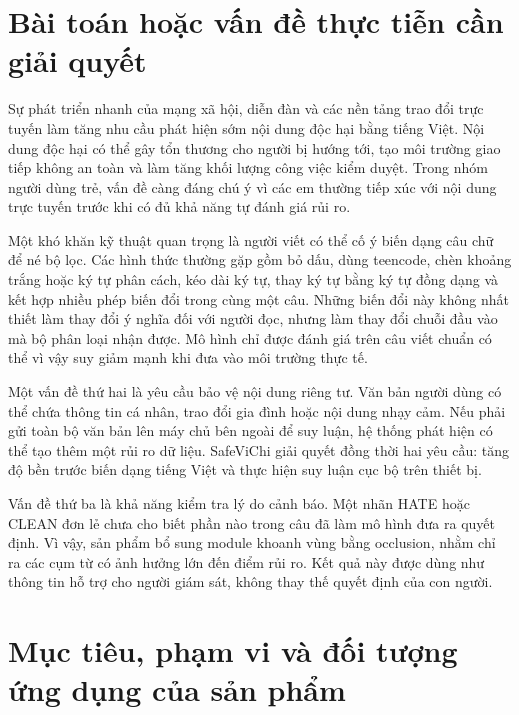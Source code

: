 \documentclass[12pt,a4paper]{article}
\begin{document}

\section{Bài toán hoặc vấn đề thực tiễn cần giải quyết}
Sự phát triển nhanh của mạng xã hội, diễn đàn và các nền tảng trao đổi trực tuyến làm tăng nhu cầu phát hiện sớm nội dung độc hại bằng tiếng Việt. Nội dung độc hại có thể gây tổn thương cho người bị hướng tới, tạo môi trường giao tiếp không an toàn và làm tăng khối lượng công việc kiểm duyệt. Trong nhóm người dùng trẻ, vấn đề càng đáng chú ý vì các em thường tiếp xúc với nội dung trực tuyến trước khi có đủ khả năng tự đánh giá rủi ro.

Một khó khăn kỹ thuật quan trọng là người viết có thể cố ý biến dạng câu chữ để né bộ lọc. Các hình thức thường gặp gồm bỏ dấu, dùng teencode, chèn khoảng trắng hoặc ký tự phân cách, kéo dài ký tự, thay ký tự bằng ký tự đồng dạng và kết hợp nhiều phép biến đổi trong cùng một câu. Những biến đổi này không nhất thiết làm thay đổi ý nghĩa đối với người đọc, nhưng làm thay đổi chuỗi đầu vào mà bộ phân loại nhận được. Mô hình chỉ được đánh giá trên câu viết chuẩn có thể vì vậy suy giảm mạnh khi đưa vào môi trường thực tế.

Một vấn đề thứ hai là yêu cầu bảo vệ nội dung riêng tư. Văn bản người dùng có thể chứa thông tin cá nhân, trao đổi gia đình hoặc nội dung nhạy cảm. Nếu phải gửi toàn bộ văn bản lên máy chủ bên ngoài để suy luận, hệ thống phát hiện có thể tạo thêm một rủi ro dữ liệu. SafeViChi giải quyết đồng thời hai yêu cầu: tăng độ bền trước biến dạng tiếng Việt và thực hiện suy luận cục bộ trên thiết bị.

Vấn đề thứ ba là khả năng kiểm tra lý do cảnh báo. Một nhãn HATE hoặc CLEAN đơn lẻ chưa cho biết phần nào trong câu đã làm mô hình đưa ra quyết định. Vì vậy, sản phẩm bổ sung module khoanh vùng bằng occlusion, nhằm chỉ ra các cụm từ có ảnh hưởng lớn đến điểm rủi ro. Kết quả này được dùng như thông tin hỗ trợ cho người giám sát, không thay thế quyết định của con người.

\section{Mục tiêu, phạm vi và đối tượng ứng dụng của sản phẩm}
\end{document}
